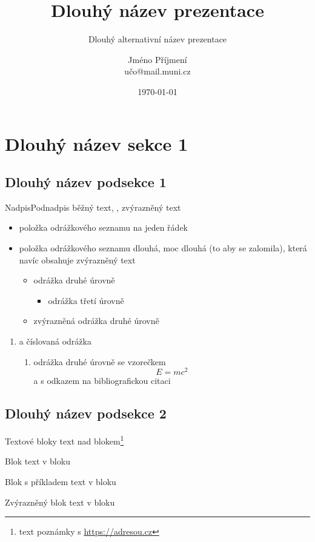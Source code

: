 \documentclass[
]{beamer}
\title[Název prezentace]{Dlouhý název prezentace}
\subtitle[Alternativní název prezentace]{Dlouhý alternativní název prezentace}
\author[J.\,Příjmení]{Jméno Příjmení\texorpdfstring{\\}{, }učo@mail.muni.cz}
\institute[Rektorát MU]{Rektorát Masarykovy univerzity}
\date{\today}
\begin{document}
\begin{frame}[plain]
\maketitle
\end{frame}

\section[Název sekce 1]{Dlouhý název sekce 1}
\subsection[Název podsekce 1]{Dlouhý název podsekce 1}

\begin{frame}{Nadpis}{Podnadpis}
běžný text, , \alert{zvýrazněný text}
\begin{itemize}
  \item položka odrážkového seznamu na jeden řádek
  \item položka odrážkového seznamu dlouhá, moc dlouhá (to aby se zalomila),
    která navíc obsahuje \alert{zvýrazněný text}
  \begin{itemize}
    \item odrážka druhé úrovně
    \begin{itemize}
      \item odrážka třetí úrovně
    \end{itemize}
    \item \alert{zvýrazněná odrážka druhé úrovně}
  \end{itemize}
\end{itemize}
\begin{enumerate}
  \item a číslovaná odrážka
  \begin{enumerate}
    \item odrážka druhé úrovně se vzorečkem
      \[ E = mc^2 \]
      a s odkazem na bibliografickou citaci \cite{einstein1905tragheit}
  \end{enumerate}
\end{enumerate}
\end{frame}

\subsection[Název podsekce 2]{Dlouhý název podsekce 2}

\begin{frame}{Textové bloky}
text nad blokem\footnote{text poznámky s \url{https://adresou.cz}}
\begin{block}{Blok}
  text v bloku
\end{block}
\begin{exampleblock}{Blok s příkladem}
  text v bloku
\end{exampleblock}
\begin{alertblock}{Zvýrazněný blok}
  text v bloku
\end{alertblock}
\end{frame}
\end{document}
